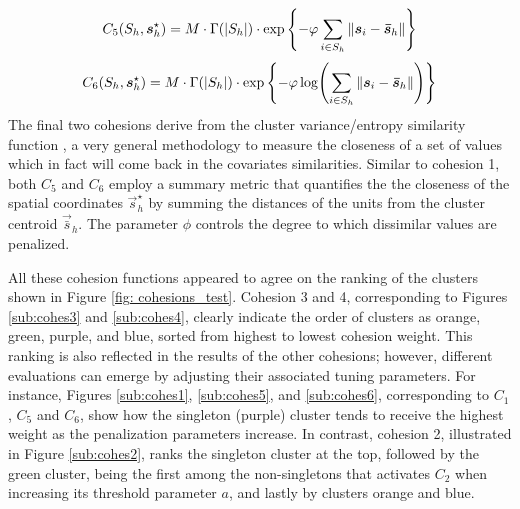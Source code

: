 \documentclass[12pt,	%
	a4paper,		%
	twoside,		%
	openright,		%
	titlepage,%
	]{book}
\theoremstyle{definition}
\let\cite\citep
\begin{document}
\begin{equation}    
C_5(S_{h},\boldsymbol{s}_{h}^\star) = M\cdot \Gamma(|S_h|)\cdot \exp \left\{ -\varphi \sum_{i \in S_h} \| \boldsymbol{s}_i - \boldsymbol{\bar{s}}_h\|  \right\}
\end{equation}
\begin{equation}    
C_6(S_{h},\boldsymbol{s}_{h}^\star) = M\cdot \Gamma(|S_h|)\cdot \exp \left\{ -\varphi \log( \sum_{i \in S_h} \| \boldsymbol{s}_i - \boldsymbol{\bar{s}}_h\| ) \right\}
\end{equation}
The final two cohesions derive from the cluster variance/entropy similarity function \cite{paper6}, a very general methodology to measure the closeness of a set of values which in fact will come back in the covariates similarities. Similar to cohesion 1, both $C_5$ and $C_6$ employ a summary metric that quantifies the the closeness of the spatial coordinates $\vec{s}^\star_h$ by summing the distances of the units from the cluster centroid $\vec{\bar s}_h$. The parameter $\phi$ controls the degree to which dissimilar values are penalized. 

All these cohesion functions appeared to agree on the ranking of the clusters shown in Figure \ref{fig: cohesions_test}. Cohesion 3 and 4, corresponding to Figures \ref{sub:cohes3} and \ref{sub:cohes4}, clearly indicate the order of clusters as orange, green, purple, and blue, sorted from highest to lowest cohesion weight. This ranking is also reflected in the results of the other cohesions; however, different evaluations can emerge by adjusting their associated tuning parameters. For instance, Figures \ref{sub:cohes1}, \ref{sub:cohes5}, and \ref{sub:cohes6}, corresponding to $C_1$, $C_5$ and $C_6$, show how the singleton (purple) cluster tends to receive the highest weight as the penalization parameters increase. In contrast, cohesion 2, illustrated in Figure \ref{sub:cohes2}, ranks the singleton cluster at the top, followed by the green cluster, being the first among the non-singletons that activates $C_2$ when increasing its threshold parameter $a$, and lastly by clusters orange and blue.
\end{document}
